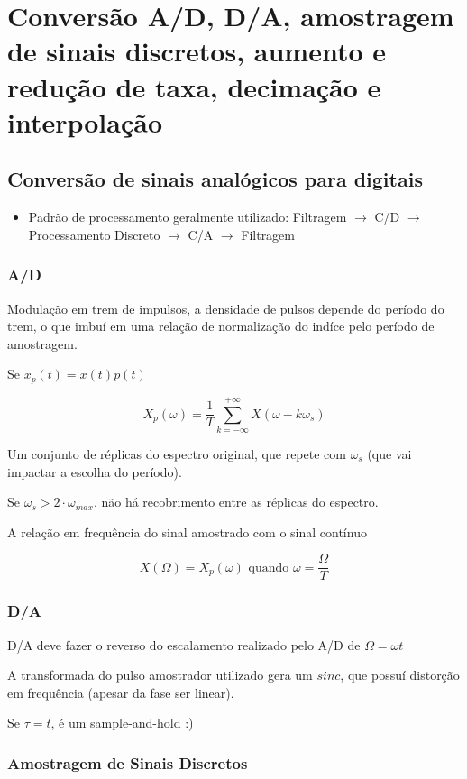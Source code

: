 \chapter{Conversão A/D, D/A, amostragem de sinais discretos, aumento e redução de taxa, decimação e interpolação}
\section{Conversão de sinais analógicos para digitais}

\begin{itemize}
    \item Padrão de processamento geralmente utilizado: Filtragem $\rightarrow$ C/D $\rightarrow$ Processamento Discreto $\rightarrow$ C/A $\rightarrow$ Filtragem
\end{itemize}

\subsection{A/D}

Modulação em trem de impulsos, a densidade de pulsos depende do período do trem, o que imbuí em uma relação de normalização do indíce pelo período de amostragem.

Se $x_{p}(t) = x(t) p(t)$

\[X_{p}(\omega) = \frac{1}{T}\sum_{k = -\infty}^{+\infty}X(\omega - k\omega_{s})\]

Um conjunto de réplicas do espectro original, que repete com $\omega_{s}$ (que vai impactar a escolha do período).

Se $\omega_{s} > 2 \cdot \omega_{max}$, não há recobrimento entre as réplicas do espectro.

A relação em frequência do sinal amostrado com o sinal contínuo

\[X(\Omega) = X_{p}(\omega) \text{ quando } \omega = \frac{\Omega}{T}\]

\subsection{D/A}

D/A deve fazer o reverso do escalamento realizado pelo A/D de $\Omega = \omega t$

A transformada do pulso amostrador utilizado gera um $sinc$, que possuí distorção em frequência (apesar da fase ser linear).

Se $\tau = t$, é um sample-and-hold :)

\subsection{Amostragem de Sinais Discretos}

